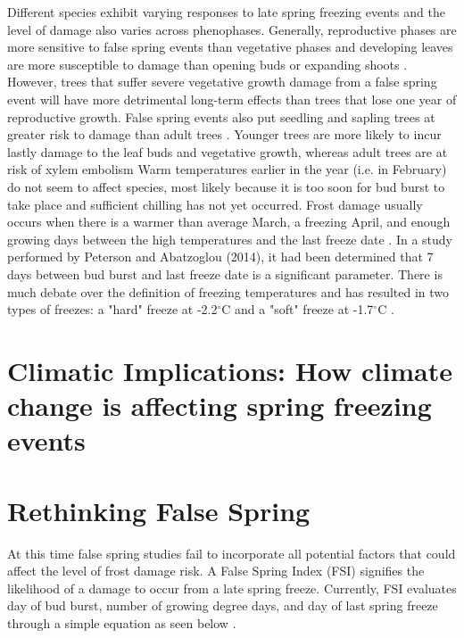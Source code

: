 \documentclass{article}\usepackage[]{graphicx}\usepackage[]{color}
\begin{document}
Different species exhibit varying responses to late spring freezing events and the level of damage also varies across phenophases. Generally, reproductive phases are more sensitive to false spring events than vegetative phases and developing leaves are more susceptible to damage than opening buds or expanding shoots \citep{Peterson2014}. However, trees that suffer severe vegetative growth damage from a false spring event will have more detrimental long-term effects than trees that lose one year of reproductive growth.
False spring events also put seedling and sapling trees at greater risk to damage than adult trees \citep{Vitasse2014}. Younger trees are more likely to incur lastly damage to the leaf buds and vegetative growth, whereas adult trees are at risk of xylem embolism %
Warm temperatures earlier in the year (i.e. in February) do not seem to affect species, most likely because it is too soon for bud burst to take place and sufficient chilling has not yet occurred. Frost damage usually occurs when there is a warmer than average March, a freezing April, and enough growing days between the high temperatures and the last freeze date \citep{Augspurger2013}. 
In a study performed by Peterson and Abatzoglou (2014), it had been determined that 7 days between bud burst and last freeze date is a significant parameter. There is much debate over the definition of freezing temperatures and has resulted in two types of freezes: a "hard" freeze at -2.2$^{\circ}$C and a "soft" freeze at -1.7$^{\circ}$C \citep{Augspurger2013, Kodra2011, Vavrus2006}.

\section*{Climatic Implications: How climate change is affecting spring freezing events}


\section*{Rethinking False Spring}
At this time false spring studies fail to incorporate all potential factors that could affect the level of frost damage risk. A False Spring Index (FSI) signifies the likelihood of a damage to occur from a late spring freeze. Currently, FSI evaluates day of bud burst, number of growing degree days, and day of last spring freeze through a simple equation as seen below \citep{Marino2011}. 
\end{document}
